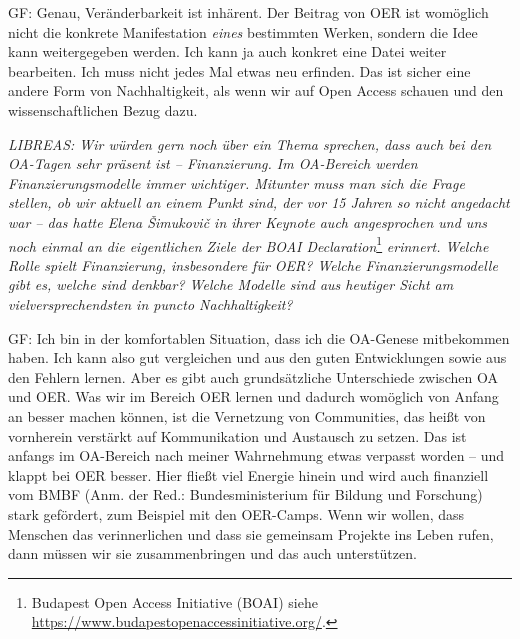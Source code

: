 \documentclass[a4paper,
fontsize=11pt,
oneside,
numbers=noperiodatend,
parskip=half-,
bibliography=totoc,
final
]{scrartcl}
\begin{document}
GF: Genau, Veränderbarkeit ist inhärent. Der Beitrag von OER ist
womöglich nicht die konkrete Manifestation \emph{eines} bestimmten
Werken, sondern die Idee kann weitergegeben werden. Ich kann ja auch
konkret eine Datei weiter bearbeiten. Ich muss nicht jedes Mal etwas neu
erfinden. Das ist sicher eine andere Form von Nachhaltigkeit, als wenn
wir auf Open Access schauen und den wissenschaftlichen Bezug dazu.

\emph{LIBREAS: Wir würden gern noch über ein Thema sprechen, dass auch
bei den OA-Tagen sehr präsent ist -- Finanzierung. Im OA-Bereich werden
Finanzierungsmodelle immer wichtiger. Mitunter muss man sich die Frage
stellen, ob wir aktuell an einem Punkt sind, der vor 15 Jahren so nicht
angedacht war -- das hatte Elena Šimukovič in ihrer Keynote auch
angesprochen und uns noch einmal an die eigentlichen Ziele der BOAI
Declaration}\footnote{Budapest Open Access Initiative (BOAI) siehe
  \url{https://www.budapestopenaccessinitiative.org/}.} \emph{erinnert.
Welche Rolle spielt Finanzierung, insbesondere für OER? Welche
Finanzierungsmodelle gibt es, welche sind denkbar? Welche Modelle sind
aus heutiger Sicht am vielversprechendsten in puncto Nachhaltigkeit?}

GF: Ich bin in der komfortablen Situation, dass ich die OA-Genese
mitbekommen haben. Ich kann also gut vergleichen und aus den guten
Entwicklungen sowie aus den Fehlern lernen. Aber es gibt auch
grundsätzliche Unterschiede zwischen OA und OER. Was wir im Bereich OER
lernen und dadurch womöglich von Anfang an besser machen können, ist die
Vernetzung von Communities, das heißt von vornherein verstärkt auf
Kommunikation und Austausch zu setzen. Das ist anfangs im OA-Bereich
nach meiner Wahrnehmung etwas verpasst worden -- und klappt bei OER
besser. Hier fließt viel Energie hinein und wird auch finanziell vom
BMBF (Anm. der Red.: Bundesministerium für Bildung und Forschung) stark
gefördert, zum Beispiel mit den OER-Camps. Wenn wir wollen, dass
Menschen das verinnerlichen und dass sie gemeinsam Projekte ins Leben
rufen, dann müssen wir sie zusammenbringen und das auch unterstützen.
\end{document}
